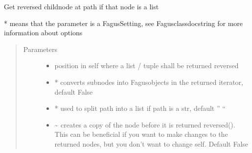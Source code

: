 \documentclass[a4paper,10pt,english]{sphinxmanual}
\begin{document}
\begin{fulllineitems}
\begin{fulllineitems}
\end{fulllineitems}


\begin{fulllineitems}
\label{\detokenize{fagus.fagus:fagus.fagus.Fagus.reversed}}
\pysigstartsignatures
{}
\pysigstopsignatures
\sphinxAtStartPar
Get reversed child\sphinxhyphen{}node at path if that node is a list

\sphinxAtStartPar
* means that the parameter is a Fagus\sphinxhyphen{}Setting, see Fagus\sphinxhyphen{}class\sphinxhyphen{}docstring for more information about options
\begin{quote}\begin{description}
\item[{Parameters}] \leavevmode\begin{itemize}
\item {}
\sphinxAtStartPar
{} \textendash{} position in self where a list / tuple shall be returned reversed

\item {}
\sphinxAtStartPar
{} \textendash{} * converts sub\sphinxhyphen{}nodes into Fagus\sphinxhyphen{}objects in the returned iterator, default False

\item {}
\sphinxAtStartPar
{} \textendash{} * used to split path into a list if path is a str, default ” “

\item {}
\sphinxAtStartPar
{} \textendash{} \textasciitilde{} creates a copy of the node before it is returned reversed(). This can be beneficial if you want to
make changes to the returned nodes, but you don’t want to change self. Default False


\end{itemize}
\end{description}
\end{quote}
\end{fulllineitems}
\end{fulllineitems}
\end{document}

